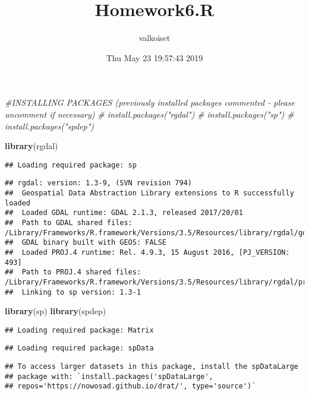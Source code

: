 \documentclass[]{article}
\title{Homework6.R}
\author{valkoiset}
\date{Thu May 23 19:57:43 2019}
\newenvironment{Shaded}{\begin{snugshade}}{\end{snugshade}}
\newcommand{\KeywordTok}[1]{\textcolor[rgb]{0.13,0.29,0.53}{\textbf{#1}}}
\newcommand{\CommentTok}[1]{\textcolor[rgb]{0.56,0.35,0.01}{\textit{#1}}}
\newcommand{\NormalTok}[1]{#1}
\begin{document}
\maketitle

\begin{Shaded}
\begin{Highlighting}[]
\CommentTok{#INSTALLING PACKAGES (previously installed packages commented - please uncomment if necessary)}
\CommentTok{# install.packages("rgdal")}
\CommentTok{# install.packages("sp")}
\CommentTok{# install.packages("spdep")}

\KeywordTok{library}\NormalTok{(rgdal)}
\end{Highlighting}
\end{Shaded}

\begin{verbatim}
## Loading required package: sp
\end{verbatim}

\begin{verbatim}
## rgdal: version: 1.3-9, (SVN revision 794)
##  Geospatial Data Abstraction Library extensions to R successfully loaded
##  Loaded GDAL runtime: GDAL 2.1.3, released 2017/20/01
##  Path to GDAL shared files: /Library/Frameworks/R.framework/Versions/3.5/Resources/library/rgdal/gdal
##  GDAL binary built with GEOS: FALSE 
##  Loaded PROJ.4 runtime: Rel. 4.9.3, 15 August 2016, [PJ_VERSION: 493]
##  Path to PROJ.4 shared files: /Library/Frameworks/R.framework/Versions/3.5/Resources/library/rgdal/proj
##  Linking to sp version: 1.3-1
\end{verbatim}

\begin{Shaded}
\begin{Highlighting}[]
\KeywordTok{library}\NormalTok{(sp)}
\KeywordTok{library}\NormalTok{(spdep)}
\end{Highlighting}
\end{Shaded}

\begin{verbatim}
## Loading required package: Matrix
\end{verbatim}

\begin{verbatim}
## Loading required package: spData
\end{verbatim}

\begin{verbatim}
## To access larger datasets in this package, install the spDataLarge
## package with: `install.packages('spDataLarge',
## repos='https://nowosad.github.io/drat/', type='source')`
\end{verbatim}
\end{document}
